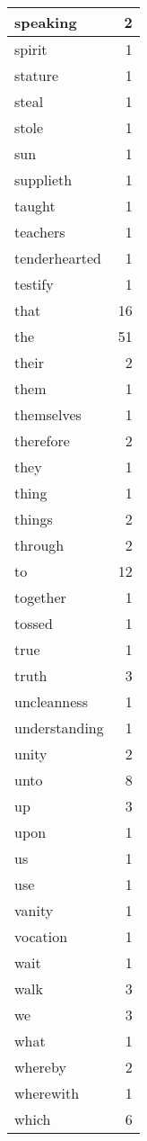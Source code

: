 \begin{center}
\begin{longtable}{l|r}
speaking & 2\\ \hline 
spirit & 1\\ \hline 
stature & 1\\ \hline 
steal & 1\\ \hline 
stole & 1\\ \hline 
sun & 1\\ \hline 
supplieth & 1\\ \hline 
taught & 1\\ \hline 
teachers & 1\\ \hline 
tenderhearted & 1\\ \hline 
testify & 1\\ \hline 
that & 16\\ \hline 
the & 51\\ \hline 
their & 2\\ \hline 
them & 1\\ \hline 
themselves & 1\\ \hline 
therefore & 2\\ \hline 
they & 1\\ \hline 
thing & 1\\ \hline 
things & 2\\ \hline 
through & 2\\ \hline 
to & 12\\ \hline 
together & 1\\ \hline 
tossed & 1\\ \hline 
true & 1\\ \hline 
truth & 3\\ \hline 
uncleanness & 1\\ \hline 
understanding & 1\\ \hline 
unity & 2\\ \hline 
unto & 8\\ \hline 
up & 3\\ \hline 
upon & 1\\ \hline 
us & 1\\ \hline 
use & 1\\ \hline 
vanity & 1\\ \hline 
vocation & 1\\ \hline 
wait & 1\\ \hline 
walk & 3\\ \hline 
we & 3\\ \hline 
what & 1\\ \hline 
whereby & 2\\ \hline 
wherewith & 1\\ \hline 
which & 6\\ \hline 

\end{longtable}
\end{center}
